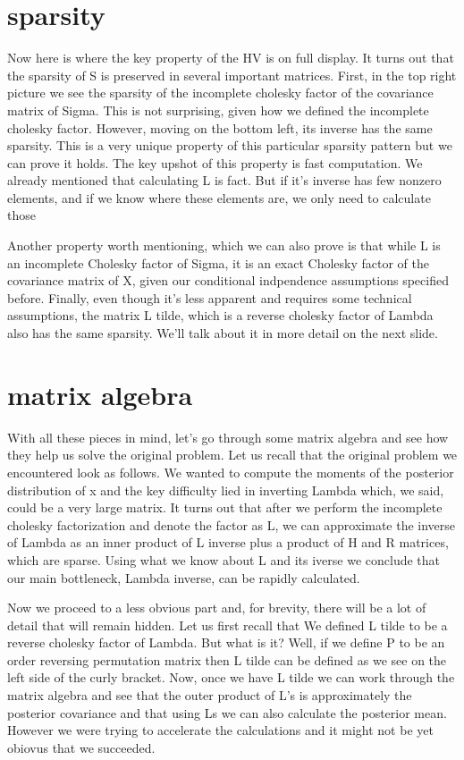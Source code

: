 \documentclass[14pt]{extarticle} %
\begin{document}
\newpage
\section*{sparsity}


Now here is where the key property of the HV is on full display. It turns out that the sparsity of S is preserved in several important matrices. First, in the top right picture we see the sparsity of the incomplete cholesky factor of the covariance matrix of Sigma. This is not surprising, given how we defined the incomplete cholesky factor. However, moving on the bottom left, its inverse has the same sparsity. This is a very unique property of this particular sparsity pattern but we can prove it holds. The key upshot of this property is fast computation. We already mentioned that calculating L is fact. But if it's inverse has few nonzero elements, and if we know where these elements are, we only need to calculate those

Another property worth mentioning, which we can also prove is that while L is an incomplete Cholesky factor of Sigma, it is an exact Cholesky factor of the covariance matrix of X, given our conditional indpendence assumptions specified before. Finally, even though it's less apparent and requires some technical assumptions, the matrix L tilde, which is a reverse cholesky factor of Lambda also has the same sparsity. We'll talk about it in more detail on the next slide.

\newpage
\section*{matrix algebra}


With all these pieces in mind, let's go through some matrix algebra and see how they help us solve the original problem. Let us recall that the original problem we encountered look as follows. We wanted to compute the moments of the posterior distribution of x and the key difficulty lied in inverting Lambda which, we said, could be a very large matrix.
It turns out that after we perform the incomplete cholesky factorization and denote the factor as L, we can approximate the inverse of Lambda as an inner product of L inverse plus a product of H and R matrices, which are sparse. Using what we know about L and its iverse we conclude that our main bottleneck, Lambda inverse, can be rapidly calculated.

Now we proceed to a less obvious part and, for brevity, there will be a lot of detail that will remain hidden. Let us first recall that We defined L tilde to be a reverse cholesky factor of Lambda. But what is it? Well, if we define P to be an order reversing permutation matrix then L tilde can be defined as we see on the left side of the curly bracket. Now, once we have L tilde we can work through the matrix algebra and see that the outer product of L's is approximately the posterior covariance and that using Ls we can also calculate the posterior mean. However we were trying to accelerate the calculations and it might not be yet obiovus that we succeeded. 
\end{document}
